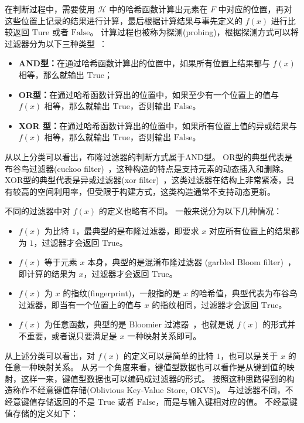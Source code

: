 在判断过程中，需要使用 $\mathcal{H}$ 中的哈希函数计算出元素在 $F$ 中对应的位置，再对这些位置上记录的结果进行计算，最后根据计算结果与事先定义的 $f(x)$ 进行比较返回 $\mbox{Ture}$ 或者 $\mbox{False}$。
计算过程也被称为探测(probing)，根据探测方式可以将过滤器分为以下三种类型~\cite{dillinger2021ribbon}：
\begin{itemize}
    \item \textbf{AND型：}在通过哈希函数计算出的位置中，如果所有位置上结果都与 $f(x)$ 相等，那么就输出 $\mbox{True}$；
    \item \textbf{OR型：}在通过哈希函数计算出的位置中，如果至少有一个位置上的值与 $f(x)$ 相等，那么就输出 $\mbox{True}$，否则输出 $\mbox{False}$。
    \item \textbf{XOR 型：}在通过哈希函数计算出的位置中，如果所有位置上值的异或结果与 $f(x)$ 相等，那么就输出 $\mbox{True}$，否则输出 $\mbox{False}$。
\end{itemize}
从以上分类可以看出，布隆过滤器的判断方式属于AND型。
OR型的典型代表是布谷鸟过滤器(cuckoo filter)~\cite{fan2014cuckoo}，这种构造的特点是支持元素的动态插入和删除。
XOR型的典型代表是异或过滤器(xor filter)~\cite{fan2014cuckoo}，这类过滤器在结构上非常紧凑，具有较高的空间利用率，但受限于构建方式，这类构造通常不支持动态更新。

不同的过滤器中对 $f(x)$ 的定义也略有不同。
一般来说分为以下几种情况：
\begin{itemize}
    \item $f(x)$ 为比特 $1$，最典型的是布隆过滤器，即要求 $x$ 对应所有位置上的结果都为 $1$，过滤器才会返回 $\mbox{True}$。
    \item $f(x)$ 等于元素 $x$ 本身，典型的是混淆布隆过滤器 (garbled Bloom filter)~\cite{dong2013when}，即计算的结果为 $x$，过滤器才会返回 $\mbox{True}$。
    \item $f(x)$ 为 $x$ 的指纹(fingerprint)，一般指的是 $x$ 的哈希值，典型代表为布谷鸟过滤器，即当有一个位置上的值与 $x$ 的指纹相同，过滤器才会返回 $\mbox{True}$。
    \item $f(x)$ 为任意函数，典型的是 Bloomier 过滤器~\cite{chazelle2004bloomier}，也就是说 $f(x)$ 的形式并不重要，或者说只要满足是 $x$ 一种映射关系即可。
\end{itemize}

从上述分类可以看出，对 $f(x)$ 的定义可以是简单的比特 $1$，也可以是关于 $x$ 的任意一种映射关系。
从另一个角度来看，键值型数据也可以看作是从键到值的映射，这样一来，键值型数据也可以编码成过滤器的形式。
按照这种思路得到的构造称作不经意键值存储(Oblivious Key-Value Store, OKVS)。
与过滤器不同，不经意键值存储返回的不是 $\mbox{True}$ 或者 $\mbox{False}$，而是与输入键相对应的值。
不经意键值存储的定义如下：

